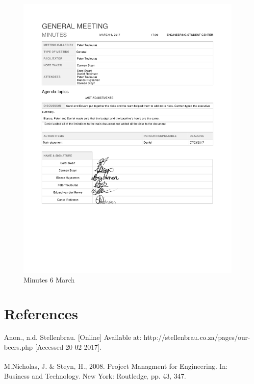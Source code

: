 \begin{appendices}
\begin{figure}[H]
\centering
\includegraphics[scale=0.25]{Meeting_minutes_6_March.png}
\caption{Minutes 6 March}
\end{figure}

\end{appendices}

\newpage
\section*{References}

Anon., n.d. Stellenbrau. [Online] 
Available at: http://stellenbrau.co.za/pages/our-beers.php
[Accessed 20 02 2017].\\\\

\noindent
M.Nicholas, J. \& Steyn, H., 2008. Project Managment for Engineering. In: Business and Technology. New York: Routledge, pp. 43, 347.




% 





